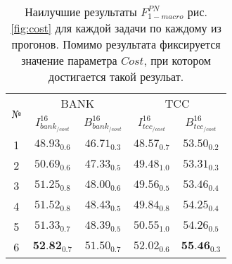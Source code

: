 \begin{table}[htp!]
\centering
\caption{Наилучшие результаты $F_{1-macro}^{PN}$ рис. \ref{fig:cost}
    для каждой задачи по каждому из прогонов.
    Помимо результата фиксируется значение параметра $Cost$, при котором
    достигается такой резульат.
}
\label{table:cost}
\begin{tabular}{ccccc}
\hline
\multicolumn{1}{c|}{\multirow{2}{*}{№}} & \multicolumn{2}{c|}{BANK}                                                   & \multicolumn{2}{c}{TCC}                                           \\ \cline{2-5}
\multicolumn{1}{c|}{}                   & \multicolumn{1}{c|}{$I_{bank_{/cost}}^{16}$} & \multicolumn{1}{c|}{$B_{bank_{/cost}}^{16}$} & \multicolumn{1}{c|}{$I_{tcc_{/cost}}^{16}$}  & $B_{tcc_{/cost}}^{16}$             \\ \hline
1                                       & $48.93_{0.6}$                                &  $46.71_{0.3}$                               &  $48.57_{0.7}$                                        & $53.50_{0.2}$                                  \\
2                                       & $50.69_{0.6}$                                &  $47.33_{0.5}$                               &  $49.48_{1.0}$                                       & $53.31_{0.3}$                                  \\
3                                       & $51.25_{0.8}$                                &  $48.00_{0.6}$                               &  $49.56_{0.5}$                                          & $53.46_{0.4}$                                  \\
4                                       & $51.52_{0.8}$                                &  $48.43_{0.5}$                               &  $49.84_{0.8}$                                         & $54.25_{0.4}$                                  \\
5                                       & $51.33_{0.7}$                                &  $48.39_{0.5}$                               &  $50.55_{1.0}$                                        & $54.26_{0.5}$                                  \\
6                                       & $\textbf{52.82}_{0.7}$                       &  $51.50_{0.7}$                               &  $52.02_{0.6}$                                        & $\textbf{55.46}_{0.3}$                         \\ \hline
\end{tabular}
\end{table}


